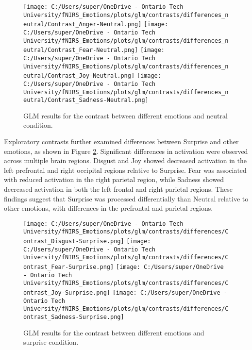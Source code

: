 \begin{figure}[H]
    \centering
    \texttt{[image: C:/Users/super/OneDrive - Ontario Tech University/fNIRS\_Emotions/plots/glm/contrasts/differences\_neutral/Contrast\_Anger-Neutral.png]}
    \texttt{[image: C:/Users/super/OneDrive - Ontario Tech University/fNIRS\_Emotions/plots/glm/contrasts/differences\_neutral/Contrast\_Fear-Neutral.png]}
    \texttt{[image: C:/Users/super/OneDrive - Ontario Tech University/fNIRS\_Emotions/plots/glm/contrasts/differences\_neutral/Contrast\_Joy-Neutral.png]}
    \texttt{[image: C:/Users/super/OneDrive - Ontario Tech University/fNIRS\_Emotions/plots/glm/contrasts/differences\_neutral/Contrast\_Sadness-Neutral.png]}
    \caption[GLM: Emotion vs. Neutral]{GLM results for the contrast between different emotions and neutral condition.}
    \label{fig:glm_emotion_analysis_neutral}
\end{figure}

Exploratory contrasts further examined differences between Surprise and other emotions, as shown in Figure \ref{fig:glm_emotion_analysis_surprise}. 
Significant differences in activation were observed across multiple brain regions. 
Disgust and Joy showed decreased activation in the left prefrontal and right occipital regions relative to Surprise. 
Fear was associated with reduced activation in the right parietal region, while Sadness showed decreased activation in both the left frontal and right parietal regions. 
These findings suggest that Surprise was processed differentially than Neutral relative to other emotions, with differences in the prefrontal and parietal regions. 

\begin{figure}[H]
    \centering
      \texttt{[image: C:/Users/super/OneDrive - Ontario Tech University/fNIRS\_Emotions/plots/glm/contrasts/differences/Contrast\_Disgust-Surprise.png]}
      \texttt{[image: C:/Users/super/OneDrive - Ontario Tech University/fNIRS\_Emotions/plots/glm/contrasts/differences/Contrast\_Fear-Surprise.png]}
      \texttt{[image: C:/Users/super/OneDrive - Ontario Tech University/fNIRS\_Emotions/plots/glm/contrasts/differences/Contrast\_Joy-Surprise.png]}
      \texttt{[image: C:/Users/super/OneDrive - Ontario Tech University/fNIRS\_Emotions/plots/glm/contrasts/differences/Contrast\_Sadness-Surprise.png]}
      \caption[GLM: Emotion vs. Surprise]{GLM results for the contrast between different emotions and surprise condition.}
      \label{fig:glm_emotion_analysis_surprise}
\end{figure}

